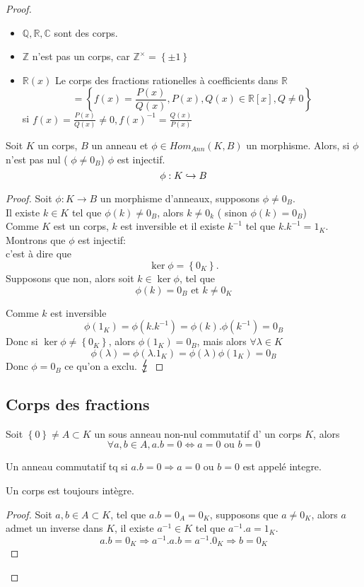 \documentclass[../main.tex]{subfiles}
\begin{document}
\begin{proof}
\begin{exemple}
\begin{itemize}
\item $\mathbb{Q}, \mathbb{R}, \mathbb{C}$ sont des corps.
\item $\mathbb{Z}$ n'est pas un corps, car $\mathbb{Z}^{\times}= \left\{ \pm 1 \right\} $
\item $\mathbb{R}(x)$ Le corps des fractions rationelles à coefficients dans $\mathbb{R}$ 
	\[ 
		= \left\{ f(x) = \frac{P(x)}{Q(x)} , P(x), Q(x) \in \mathbb{R}[x], Q \neq 0\right\} 
	\]
	si $f(x) = \frac{P(x)}{Q(x)} \neq 0, f(x)^{-1}= \frac{Q(x)}{P(x)}$
\end{itemize}
\end{exemple}
\begin{propo}
	Soit $K$ un corps, $B$ un anneau et $\phi \in Hom_{Ann} ( K,B)$ un morphisme. Alors, si $\phi$ n'est pas nul ( $\phi \neq 0_B$) $\phi$ est injectif.
	\[ 
	\phi: K \hookrightarrow B
	\]
	
\end{propo}
\begin{proof}
Soit $\phi: K \to B $ un morphisme d'anneaux, supposons $\phi \neq 0_B$.\\
Il existe $k  \in K $ tel que $\phi(k) \neq 0_B$, alors $k \neq 0_k$ ( sinon $\phi(k) = 0_B$)\\
Comme $K$ est un corps, $k$ est inversible et il existe $k^{-1}$ tel que $k . k^{-1}= 1_K$.\\
Montrons que $\phi$ est injectif:\\
c'est à dire que 
\[ 
	\ker \phi = \left\{ 0_K \right\} .
\]
Supposons que non, alors soit $k \in \ker \phi$, tel que 
\[ 
	\phi(k) = 0_B \text{ et  } k \neq  0_K
\]

Comme $k$ est inversible
\[ 
	\phi(1_K) = \phi(k.k^{-1}) = \phi(k) . \phi(k^{-1}) = 0_B
\]
Donc si $\ker \phi \neq \left\{ 0_K \right\}$, alors $\phi(1_K) = 0_B$, mais alors $\forall \lambda \in K$
\[ 
	\phi( \lambda) = \phi(\lambda . 1_K) = \phi(\lambda) \phi(1_K) = 0_B
\]
Donc $\phi = 0_B$ ce qu'on a exclu. $\contra$


\end{proof}
\subsection{Corps des fractions}
\begin{lemma}
Soit $ \left\{ 0 \right\} \neq A \subset K$ un sous anneau non-nul commutatif d' un corps $K$, alors
\[ 
\forall a,b \in A, a.b = 0 \iff a =0 \text{ ou } b=0
\]
\end{lemma}
\begin{defn}
Un anneau commutatif tq si $a.b=0 \Rightarrow a=0 \text{ ou } b=0$ est appelé integre.
\end{defn}
Un corps est toujours intègre.
\begin{proof}
Soit $a,b \in A \subset K$, tel que $a.b =0_A = 0_K$, supposons que 
$a \neq 0_K$, alors $a$ admet un inverse dans $K$, il existe $a^{-1}\in K$ tel que $a^{-1}.a = 1_K$.\\
\[ 
a.b = 0_K \Rightarrow a^{-1}.a.b = a^{-1}. 0_K \Rightarrow b =0_K
\]


\end{proof}
\end{proof}
\end{document}
